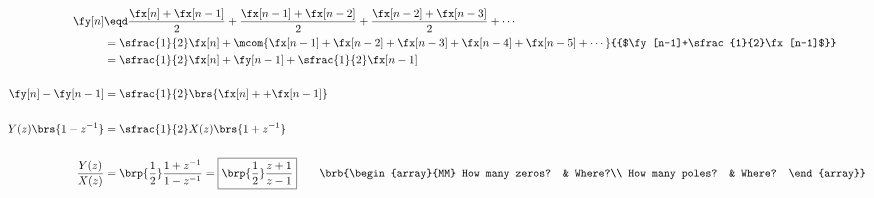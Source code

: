 {\begin{align*}
  \fy[n]
    &\eqd \frac{\fx[n]+\fx[n-1]}{2} + \frac{\fx[n-1]+\fx[n-2]}{2} + \frac{\fx[n-2]+\fx[n-3]}{2} + \cdots
  \\&=    \sfrac{1}{2}\fx[n] + \mcom{\fx[n-1] + \fx[n-2] + \fx[n-3] + \fx[n-4] + \fx[n-5] + \cdots}{{$\fy[n-1]+\sfrac{1}{2}\fx[n-1]$}}
  \\&=    \sfrac{1}{2}\fx[n] + \fy[n-1]+\sfrac{1}{2}\fx[n-1]
  \\\\
  \fy[n]-\fy[n-1]&=    \sfrac{1}{2}\brs{\fx[n] + +\fx[n-1]} 
  \\\\
  Y(z)\brs{1-z^{-1}} &= \sfrac{1}{2} X(z)\brs{1+z^{-1}}
  \\\\
  \frac{Y(z)}{X(z)} 
    &= \brp{\frac{1}{2}} \frac{1+z^{-1}}{1-z^{-1}}
     = \boxed{\brp{\frac{1}{2}} \frac{z+1}{z-1}} 
  \qquad\brb{\begin{array}{MM}
    How many zeros? & Where?\\
    How many poles? & Where?
  \end{array}}
\end{align*}}


